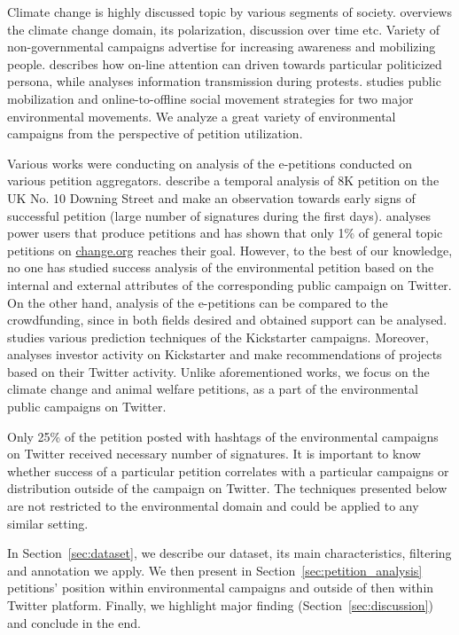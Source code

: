 Climate change is highly discussed topic by various segments of society. \cite{Kirilenko2014} overviews the climate change domain, its polarization, discussion over time etc.
Variety of non-governmental campaigns advertise for increasing awareness and mobilizing people.
\cite{Tufekci2013} describes how on-line attention can driven towards particular politicized persona, while \cite{gonzalez2013networked} analyses information transmission during protests.
\cite{hestres2013preaching} studies public mobilization and online-to-offline social movement strategies for two major environmental movements. We analyze a great variety of environmental campaigns from the perspective of petition utilization.

Various works were conducting on analysis of the e-petitions conducted on various petition aggregators.
\cite{Hale2013} describe a temporal analysis of 8K petition on the UK No. 10 Downing Street and make an observation towards early signs of successful petition (large number of signatures during the first days).
\cite{Huang2015} analyses power users that produce petitions and has shown that only 1\% of general topic petitions on \url{change.org} reaches their goal.
However, to the best of our knowledge, no one has studied success analysis of the environmental petition based on the internal and external attributes of the corresponding public campaign on Twitter.
On the other hand, analysis of the e-petitions can be compared to the crowdfunding, since in both fields desired and obtained support can be analysed. \cite{Etter2013} studies various prediction techniques of the Kickstarter campaigns.
Moreover, \cite{An2014} analyses investor activity on Kickstarter and make recommendations of projects based on their Twitter activity. Unlike aforementioned works, we focus on the climate change and animal welfare petitions, as a part of the environmental public campaigns on Twitter.


Only 25\% of the petition posted with hashtags of the environmental campaigns on Twitter received necessary number of signatures. It is important to know whether success of a particular petition correlates with a particular campaigns or distribution outside of the campaign on Twitter.
The techniques presented below are not restricted to the environmental domain and could be applied to any similar setting.

In Section~\ref{sec:dataset}, we describe our dataset, its main characteristics, filtering and annotation we apply. We then present in Section~\ref{sec:petition_analysis} petitions' position within environmental campaigns and outside of then within Twitter platform. Finally, we highlight major finding (Section~\ref{sec:discussion}) and conclude in the end.